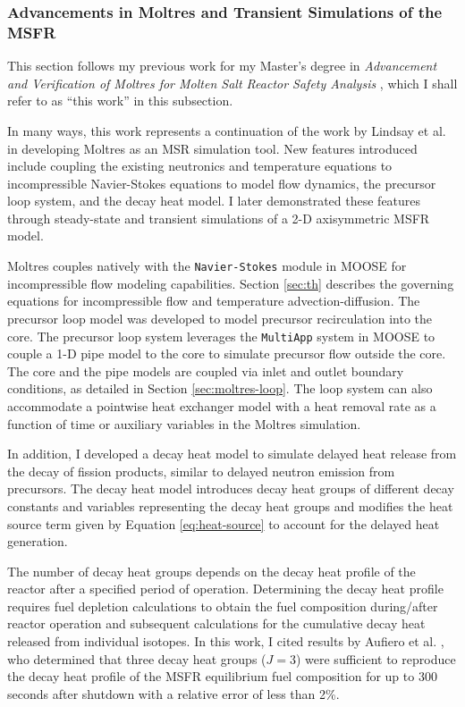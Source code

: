 \subsubsection{Advancements in Moltres and Transient Simulations of the MSFR}
\label{sec:msfr}

This section follows my previous work for my Master's degree in \textit{Advancement and
Verification of Moltres for Molten Salt Reactor Safety Analysis} \cite{park_advancement_2020},
which I shall refer to as ``this work'' in this subsection.

In many ways, this work represents a continuation of the work by Lindsay et al.
\cite{lindsay_introduction_2018} in developing Moltres as an \gls{MSR}
simulation tool. New features introduced include coupling the existing
neutronics and temperature equations to incompressible Navier-Stokes equations
to model flow dynamics, the precursor loop system, and the decay heat model.
I later demonstrated these features through steady-state and transient
simulations of a 2-D axisymmetric \gls{MSFR} model.

Moltres couples natively with the \texttt{Navier-Stokes} module in \gls{MOOSE} for
incompressible flow modeling capabilities. Section \ref{sec:th} describes the governing equations
for incompressible flow and temperature advection-diffusion.
The precursor loop model was developed to model
precursor recirculation into the core. The precursor loop system leverages
the \texttt{MultiApp} system in \gls{MOOSE} to couple a 1-D pipe model to the
core to simulate precursor flow outside the core. The core and the pipe models
are coupled via inlet and outlet boundary conditions, as detailed in Section
\ref{sec:moltres-loop}. The loop system can also accommodate a pointwise heat
exchanger model with a heat removal rate as a function of time
or auxiliary variables in the Moltres simulation.

In addition, I developed a decay heat model to simulate delayed heat release
from the decay of fission products, similar to delayed neutron emission
from precursors. The decay heat model introduces decay heat groups of different
decay constants and variables representing the decay heat groups and modifies the
heat source term given by Equation \ref{eq:heat-source} to account for
the delayed heat generation. 

The number of decay heat groups depends on
the decay heat profile of the reactor after a specified period of operation.
Determining the decay heat profile requires fuel depletion calculations to
obtain the fuel composition during/after reactor operation and subsequent
calculations for the cumulative decay heat released from individual isotopes.
In this work, I cited results by Aufiero et al. \cite{aufiero_extended_2013},
who determined that three decay heat groups ($J=3$) were sufficient to
reproduce the decay heat profile of the \gls{MSFR} equilibrium fuel composition
for up to 300 seconds after shutdown with a relative error of less than 2\%.

